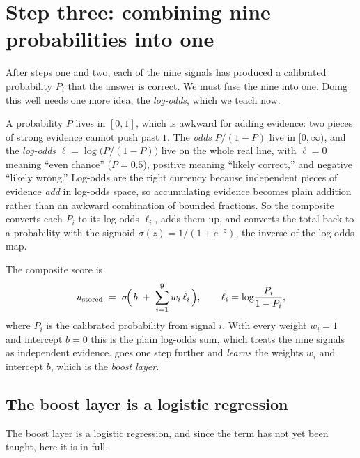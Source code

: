 \section{Step three: combining nine probabilities into one}
\label{sec:composite-boost}

After steps one and two, each of the nine signals has produced a calibrated
probability $P_i$ that the answer is correct. We must fuse the nine into one. Doing
this well needs one more idea, the \emph{log-odds}, which we teach now.

\begin{intuition}
A probability $P$ lives in $[0,1]$, which is awkward for adding evidence: two pieces
of strong evidence cannot push past $1$. The \emph{odds} $P/(1-P)$ live in
$[0,\infty)$, and the \emph{log-odds} $\ell = \log\!\big(P/(1-P)\big)$ live on the
whole real line, with $\ell = 0$ meaning ``even chance'' ($P = 0.5$), positive
meaning ``likely correct,'' and negative ``likely wrong.'' Log-odds are the right
currency because independent pieces of evidence \emph{add} in log-odds space, so
accumulating evidence becomes plain addition rather than an awkward combination of
bounded fractions. So the composite converts
each $P_i$ to its log-odds $\ell_i$, adds them up, and converts the total back to a
probability with the sigmoid $\sigma(z) = 1/(1+e^{-z})$, the inverse of the log-odds
map.
\end{intuition}

\begin{precise}
The composite score is
\[
  u_{\text{stored}} \;=\; \sigma\!\Big(\, b \;+\; \sum_{i=1}^{9} w_i\,\ell_i \,\Big),
  \qquad
  \ell_i = \log\!\frac{P_i}{1-P_i},
\]
where $P_i$ is the calibrated probability from signal $i$. With every weight $w_i = 1$
and intercept $b = 0$ this is the plain log-odds sum, which treats the nine signals as
independent evidence. \caem{} goes one step further and \emph{learns} the weights
$w_i$ and intercept $b$, which is the \emph{boost layer}.
\end{precise}

\subsection*{The boost layer is a logistic regression}

The boost layer is a logistic regression, and since the term has not yet been taught,
here it is in full.

